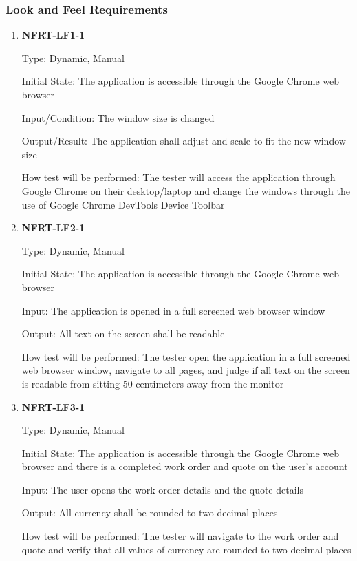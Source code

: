 \documentclass[12pt, titlepage]{article}
\begin{document}
\subsubsection{Look and Feel Requirements}

\begin{enumerate}

	\item \textbf{NFRT-LF1-1} %

	      Type: Dynamic, Manual

	      Initial State: The application is accessible through the Google Chrome web browser

	      Input/Condition: The window size is changed

	      Output/Result: The application shall adjust and scale to fit the new window size

	      How test will be performed: The tester will access the application through Google Chrome on their
	      desktop/laptop and change the windows through the use of Google Chrome DevTools Device Toolbar

	\item \textbf{NFRT-LF2-1} %

	      Type: Dynamic, Manual

	      Initial State: The application is accessible through the Google Chrome web browser

	      Input: The application is opened in a full screened web browser window

	      Output: All text on the screen shall be readable

	      How test will be performed: The tester open the application in a full screened web browser window,
	      navigate to all pages, and judge if all text on the screen is readable from sitting 50 centimeters
	      away from the monitor

	\item \textbf{NFRT-LF3-1} %

	      Type: Dynamic, Manual

	      Initial State: The application is accessible through the Google Chrome web browser and there is a
	      completed work order and quote on the user's account

	      Input: The user opens the work order details and the quote details

	      Output: All currency shall be rounded to two decimal places

	      How test will be performed: The tester will navigate to the work order and quote and verify that
	      all values of currency are rounded to two decimal places

\end{enumerate}
\end{document}
